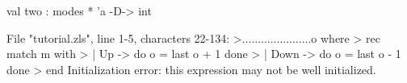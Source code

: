 \chklistingfalse
{}
\begin{ChkListingMsg}
val two : modes * 'a -D-> int
\end{ChkListingMsg}
\begin{ChkListingErr}
File "tutorial.zls", line 1-5, characters 22-134:
>......................o where
>  rec match m with
>      | Up -> do o = last o + 1 done
>      | Down -> do o = last o - 1 done
>      end
Initialization error: this expression may not be well initialized.
\end{ChkListingErr}
